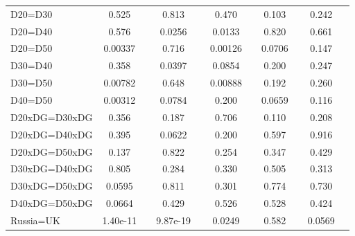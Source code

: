 \begin{tabular}{l|cccccc|cc|cc}
D20=D30         &    0.525         &         &    0.813         &         &    0.470         &         &    0.103         &         &    0.242         &         \\
D20=D40         &    0.576         &         &   0.0256         &         &   0.0133         &         &    0.820         &         &    0.661         &         \\
D20=D50         &  0.00337         &         &    0.716         &         &  0.00126         &         &   0.0706         &         &    0.147         &         \\
D30=D40         &    0.358         &         &   0.0397         &         &   0.0854         &         &    0.200         &         &    0.247         &         \\
D30=D50         &  0.00782         &         &    0.648         &         &  0.00888         &         &    0.192         &         &    0.260         &         \\
D40=D50         &  0.00312         &         &   0.0784         &         &    0.200         &         &   0.0659         &         &    0.116         &         \\
D20xDG=D30xDG   &    0.356         &         &    0.187         &         &    0.706         &         &    0.110         &         &    0.208         &         \\
D20xDG=D40xDG   &    0.395         &         &   0.0622         &         &    0.200         &         &    0.597         &         &    0.916         &         \\
D20xDG=D50xDG   &    0.137         &         &    0.822         &         &    0.254         &         &    0.347         &         &    0.429         &         \\
D30xDG=D40xDG   &    0.805         &         &    0.284         &         &    0.330         &         &    0.505         &         &    0.313         &         \\
D30xDG=D50xDG   &   0.0595         &         &    0.811         &         &    0.301         &         &    0.774         &         &    0.730         &         \\
D40xDG=D50xDG   &   0.0664         &         &    0.429         &         &    0.526         &         &    0.528         &         &    0.424         &         \\
Russia=UK       & 1.40e-11         &         & 9.87e-19         &         &   0.0249         &         &    0.582         &         &   0.0569         &         \\

\end{tabular}
